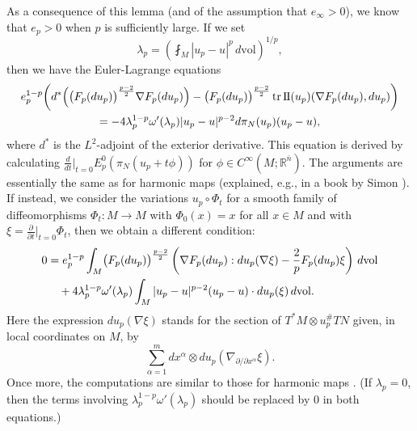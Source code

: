 \documentclass[a4paper]{article}
\newcommand{\R}{\mathbb{R}}
\newcommand{\vol}{\mathrm{vol}}
\newcommand{\ndim}{{\bar{n}}}
\newcommand{\sff}{\mathrm{I{\mkern -1mu}I}}
\let\div\relax\DeclareMathOperator{\div}{div}
\DeclareMathOperator{\tr}{tr}
\newcommand{\dd}[2]{\frac{\partial #1}{\partial #2}}
\theoremstyle{definition}
\theoremstyle{remark}
\begin{document}
As a consequence of this lemma (and of the assumption that $e_\infty > 0$), we know that $e_p > 0$ when $p$ is sufficiently large. If we set
\[
\lambda_p = \left(\fint_M |u_p - u|^p \, d\vol\right)^{1/p},
\]
then we have the Euler-Lagrange equations
\begin{multline*}
e_p^{1 - p} \biggl(d^*\Bigl(\bigl(F_p(du_p)\bigr)^{\frac{p - 2}{2}} \nabla F_p(du_p)\Bigr) - \bigl(F_p(du_p)\bigr)^{\frac{p - 2}{2}} \tr \sff(u_p)(\nabla F_p(du_p), du_p)\biggr) \\
= -4\lambda_p^{1 - p} \omega'(\lambda_p) |u_p - u|^{p - 2} d\pi_N(u_p)(u_p - u),
\end{multline*}
where $d^*$ is the $L^2$-adjoint of the exterior derivative.
This equation is derived by calculating $\frac{d}{dt}|_{t = 0} E_p^0(\pi_N(u_p + t\phi))$ for $\phi \in C^\infty(M; \R^\ndim)$. The arguments are essentially
the same as for harmonic maps (explained, e.g., in a book by Simon \cite{Simon:96}).  If instead, we consider the variations
$u_p \circ \Phi_t$ for
a smooth family of diffeomorphisms $\Phi_t \colon M \to M$ with $\Phi_0(x) = x$
for all $x \in M$ and with $\xi = \dd{}{t}|_{t = 0} \Phi_t$, then we obtain a different condition:
\[
\begin{split}
0 & = e_p^{1 - p} \int_M \bigl(F_p(du_p)\bigr)^{\frac{p - 2}{2}} \left(\nabla F_p(du_p) : du_p(\nabla \xi) - \frac{2}{p} F_p(du_p) \div \xi\right) \, d\vol \\
& \quad + 4\lambda_p^{1 - p} \omega'(\lambda_p) \int_M |u_p - u|^{p - 2} (u_p - u) \cdot du_p(\xi) \, d\vol.
\end{split}
\]
Here the expression $du_p(\nabla \xi)$ stands for the section of
$T^*M \otimes u_p^\# TN$ given, in local coordinates on $M$, by
\[
\sum_{\alpha = 1}^m dx^\alpha \otimes du_p(\nabla_{\partial/\partial x^\alpha} \xi).
\]
Once more, the computations are similar to those for harmonic maps
\cite{Price:83, Grosse-Brauckmann:92}.
(If $\lambda_p = 0$, then the terms involving $\lambda_p^{1 - p} \omega'(\lambda_p)$ should be
replaced by $0$ in both equations.)
\end{document}
